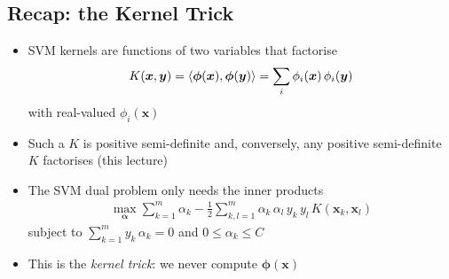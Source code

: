 \begin{slide}
\section[-2]{Recap: the Kernel Trick}

\begin{PauseHighLight}
  \begin{itemize}\squeeze
  \item SVM kernels are functions of two variables that factorise
    \begin{align*}
      K(\bm{x},\bm{y}) = \left\langle {\bm{\phi}(\bm{x})}, {\bm{\phi}(\bm{y})}\right\rangle =
      \sum_{i} \phi_i(\bm{x})\,\phi_i(\bm{y})
    \end{align*}
    with real-valued $\phi_i(\bm{x})$\pause
  \item Such a $K$ is positive semi-definite\pause{} and, conversely,
    any positive semi-definite $K$ factorises (this lecture)\pause
  \item The SVM dual problem only needs the inner products
    \begin{align*}
      \max_{\bm{\alpha}} \sum_{k=1}^m \alpha_k - \frac{1}{2}
      \sum_{k,l=1}^m \alpha_k\,\alpha_l\, y_k\,y_l\,K(\bm{x}_k,\bm{x}_l)
    \end{align*}
    subject to $\sum_{k=1}^m y_k\,\alpha_k=0$ and $0\leq \alpha_k \leq C$\pause
  \item This is the \emph{kernel trick}: we never compute
    $\bm{\phi}(\bm{x})$\pause
  \end{itemize}
\end{PauseHighLight}

\end{slide}


\Outline %

